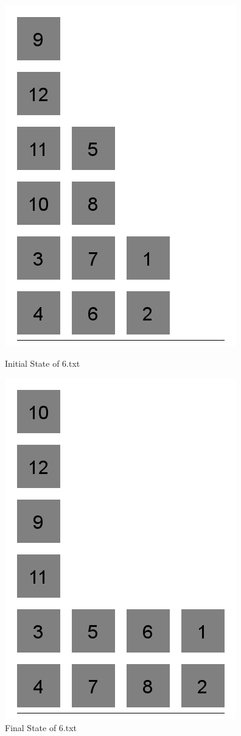 \documentclass{article}
\begin{document}
\begin{itemize}
\begin{figure}[H]
    \centering
    \begin{minipage}{0.5\textwidth}
        \centering
        \includegraphics[scale=0.3]{6i}
        \caption{Initial State  of 6.txt}
    \end{minipage}\hfill
    \begin{minipage}{0.5\textwidth}
        \centering
        \includegraphics[scale=0.3]{6f}
        \caption{Final State  of 6.txt}
    \end{minipage}
\end{figure}
\end{itemize}
\end{document}
